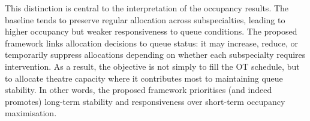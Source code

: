 This distinction is central to the interpretation of the occupancy results. 
The baseline tends to preserve regular allocation across subspecialties, leading to higher occupancy but weaker responsiveness to queue conditions. 
The proposed framework links allocation decisions to queue status: it may increase, reduce, or temporarily suppress allocations depending on whether each subspecialty requires intervention. 
As a result, the objective is not simply to fill the OT schedule, but to allocate theatre capacity where it contributes most to maintaining queue stability.
In other words, the proposed framework prioritises (and indeed promotes) long-term stability and responsiveness over short-term occupancy maximisation.

